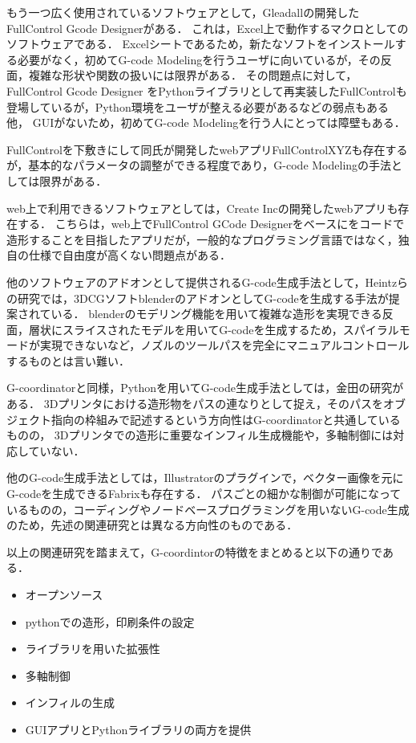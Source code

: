 \documentclass{article}
\begin{document}
\begin{twocolumn}
もう一つ広く使用されているソフトウェアとして，Gleadallの開発したFullControl Gcode Designer\cite{gleadall2021fullcontrol}がある．
これは，Excel上で動作するマクロとしてのソフトウェアである．
Excelシートであるため，新たなソフトをインストールする必要がなく，初めてG-code Modelingを行うユーザに向いているが，その反面，複雑な形状や関数の扱いには限界がある．
その問題点に対して，FullControl Gcode Designer をPythonライブラリとして再実装したFullControl\cite{fullcontrol}も登場しているが，Python環境をユーザが整える必要があるなどの弱点もある他，
GUIがないため，初めてG-code Modelingを行う人にとっては障壁もある．

FullControlを下敷きにして同氏が開発したwebアプリFullControlXYZ\cite{fullcontrolxyz}も存在するが，基本的なパラメータの調整ができる程度であり，G-code Modelingの手法としては限界がある．

web上で利用できるソフトウェアとしては，Create Incの開発したwebアプリ\cite{analysis230}も存在する．
こちらは，web上でFullControl GCode Designerをベースにをコードで造形することを目指したアプリだが，一般的なプログラミング言語ではなく，独自の仕様で自由度が高くない問題点がある．

他のソフトウェアのアドオンとして提供されるG-code生成手法として，Heintzらの研究\cite{heintz}では，3DCGソフトblenderのアドオンとしてG-codeを生成する手法が提案されている．
blenderのモデリング機能を用いて複雑な造形を実現できる反面，層状にスライスされたモデルを用いてG-codeを生成するため，スパイラルモードが実現できないなど，ノズルのツールパスを完全にマニュアルコントロールするものとは言い難い．

G-coordinatorと同様，Pythonを用いてG-code生成手法としては，金田の研究\cite{kanada2016}がある．
3Dプリンタにおける造形物をパスの連なりとして捉え，そのパスをオブジェクト指向の枠組みで記述するという方向性はG-coordinatorと共通しているものの，
3Dプリンタでの造形に重要なインフィル生成機能や，多軸制御には対応していない．

他のG-code生成手法としては，Illustratorのプラグインで，ベクター画像を元にG-codeを生成できるFabrix\cite{fabrix}も存在する．
パスごとの細かな制御が可能になっているものの，コーディングやノードベースプログラミングを用いないG-code生成のため，先述の関連研究とは異なる方向性のものである．

以上の関連研究を踏まえて，G-coordintorの特徴をまとめると以下の通りである．
\begin{itemize}
  \item オープンソース
  \item pythonでの造形，印刷条件の設定
  \item ライブラリを用いた拡張性
  \item 多軸制御
  \item インフィルの生成
  \item GUIアプリとPythonライブラリの両方を提供
  

\end{itemize}
\end{twocolumn}
\end{document}
